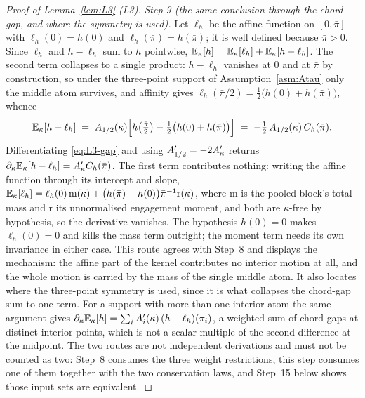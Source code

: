 \begin{proof}[Proof of Lemma~\ref{lem:L3} (L3)]
\emph{Step 9 (the same conclusion through the chord gap, and where the symmetry is used).} Let
$\ell_h$ be the affine function on $[0,\bar\pi]$ with $\ell_h(0) = h(0)$ and
$\ell_h(\bar\pi) = h(\bar\pi)$; it is well defined because $\bar\pi > 0$. Since $\ell_h$ and
$h-\ell_h$ sum to $h$ pointwise, $\mathbb{E}_\kappa[h] = \mathbb{E}_\kappa[\ell_h] + \mathbb{E}_\kappa[h-\ell_h]$. The
second term collapses to a single product: $h-\ell_h$ vanishes at $0$ and at $\bar\pi$ by
construction, so under the three-point support of Assumption~\ref{asm:Atau} only the middle atom
survives, and affinity gives $\ell_h(\bar\pi/2) = \tfrac12\bigl(h(0)+h(\bar\pi)\bigr)$, whence
\begin{equation}
\label{eq:L3-gap}
\mathbb{E}_\kappa[h-\ell_h]
 \;=\; A_{1/2}(\kappa)\Bigl[h\!\left(\tfrac{\bar\pi}{2}\right)
   - \tfrac12\bigl(h(0)+h(\bar\pi)\bigr)\Bigr]
 \;=\; -\tfrac12\,A_{1/2}(\kappa)\,C_h(\bar\pi).
\end{equation}
Differentiating \eqref{eq:L3-gap} and using $A_{1/2}' = -2A'_{\kappa}$ returns
$\partial_\kappa\mathbb{E}_\kappa[h-\ell_h] = A'_{\kappa} C_h(\bar\pi)$. The first term contributes nothing:
writing the affine function through its intercept and slope,
$\mathbb{E}_\kappa[\ell_h] = \ell_h(0)\,\mathrm{m}(\kappa) + \bigl(h(\bar\pi)-h(0)\bigr)\bar\pi^{-1}
\mathrm{r}(\kappa)$, where $\mathrm{m}$ is the pooled block's total mass and $\mathrm{r}$ its
unnormalised engagement moment, and both are $\kappa$-free by hypothesis, so the derivative vanishes.
The hypothesis $h(0)=0$ makes $\ell_h(0) = 0$ and kills the mass term outright; the moment term needs
its own invariance in either case. This route agrees with Step~8 and displays the mechanism: the
affine part of the kernel contributes no interior motion at all, and the whole motion is carried by
the mass of the single middle atom. It also locates where the three-point symmetry is used, since it
is what collapses the chord-gap sum to one term. For a support with more than one interior atom the
same argument gives $\partial_\kappa\mathbb{E}_\kappa[h] = \sum_i A_i'(\kappa)\,(h-\ell_h)(\pi_i)$, a
weighted sum of chord gaps at distinct interior points, which is not a scalar multiple of the second
difference at the midpoint. The two routes are not independent derivations and must not be counted as
two: Step~8 consumes the three weight restrictions, this step consumes one of them together with the
two conservation laws, and Step~15 below shows those input sets are equivalent.


\end{proof}
